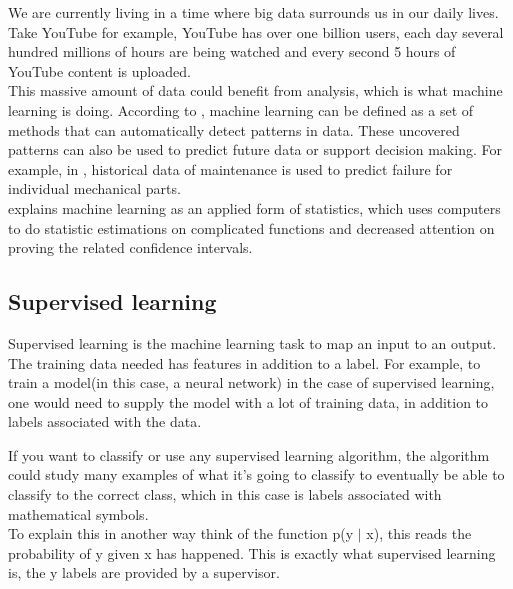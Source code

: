 We are currently living in a time where big data surrounds us in our daily lives. Take YouTube for example, YouTube has over one billion users, each day several hundred millions of hours are being watched and every second 5 hours of YouTube content is uploaded. \\ %
 This massive amount of data could benefit from analysis, which is what machine learning is doing. According to \cite{murphy_machine_2012}, machine learning can be defined as a set of methods that can automatically detect patterns in data. These uncovered patterns can also be used to predict future data or support decision making. For example, in \cite{cline_predictive_2017}, historical data of maintenance is used to predict failure for individual mechanical parts. \\
\cite{goodfellow_deep_2016} explains machine learning as an applied form of statistics, which uses computers to do statistic estimations on complicated functions and decreased attention on proving the related confidence intervals. 


\subsection{Supervised learning}
% 

Supervised learning is the machine learning task to map an input to an output. The training data needed has features in addition to a label. For example, to train a model(in this case, a neural network) in the case of supervised learning, one would need to supply the model with a lot of training data, in addition to labels associated with the data. %

If you want to classify or use any supervised learning algorithm, the algorithm could study many examples of what it's going to classify to eventually be able to classify to the correct class, which in this case is labels associated with mathematical symbols.\\ To explain this in another way think of the function p(y $|$ x), this reads the probability of y given x has happened. This is exactly what supervised learning is, the y labels are provided by a supervisor.\\

